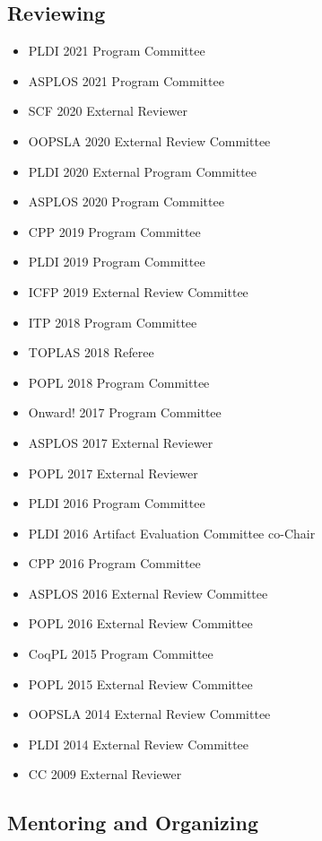 \documentclass[10pt]{article}
\begin{document}
\subsection*{Reviewing}

\begin{itemize}
  \item PLDI 2021 Program Committee
  \item ASPLOS 2021 Program Committee
  \item SCF 2020 External Reviewer
  \item OOPSLA 2020 External Review Committee
  \item PLDI 2020 External Program Committee
  \item ASPLOS 2020 Program Committee
  \item CPP 2019 Program Committee
  \item PLDI 2019 Program Committee
  \item ICFP 2019 External Review Committee
  \item ITP 2018 Program Committee
  \item TOPLAS 2018 Referee
  \item POPL 2018 Program Committee
  \item Onward! 2017 Program Committee
  \item ASPLOS 2017 External Reviewer
  \item POPL 2017 External Reviewer
  \item PLDI 2016 Program Committee
  \item PLDI 2016 Artifact Evaluation Committee co-Chair
  \item CPP 2016 Program Committee
  \item ASPLOS 2016 External Review Committee
  \item POPL 2016 External Review Committee
  \item CoqPL 2015 Program Committee
  \item POPL 2015 External Review Committee
  \item OOPSLA 2014 External Review Committee
  \item PLDI 2014 External Review Committee
  \item CC 2009 External Reviewer
\end{itemize}

\subsection*{Mentoring and Organizing}
\end{document}
